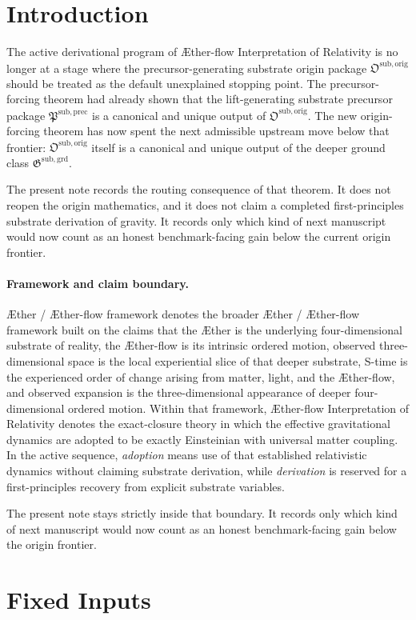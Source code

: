 \documentclass[11pt]{article}
\newcommand{\Aether}{\AE{}ther}
\newcommand{\Aflow}{\AE{}ther-flow}
\newcommand{\TheoryName}{\Aflow{} Interpretation of Relativity}
\newcommand{\TheoryProgram}{\Aether{} / \Aflow{} framework}
\newcommand{\PrecursorPackage}{\mathfrak P^{\mathrm{sub,prec}}}
\newcommand{\OriginPackage}{\mathfrak O^{\mathrm{sub,orig}}}
\newcommand{\GroundPackage}{\mathfrak G^{\mathrm{sub,grd}}}
\begin{document}
\section{Introduction}

The active derivational program of \TheoryName{} is no longer at a stage where the precursor-generating substrate origin package \(\OriginPackage\) should be treated as the default unexplained stopping point. The precursor-forcing theorem had already shown that the lift-generating substrate precursor package \(\PrecursorPackage\) is a canonical and unique output of \(\OriginPackage\). The new origin-forcing theorem has now spent the next admissible upstream move below that frontier: \(\OriginPackage\) itself is a canonical and unique output of the deeper ground class \(\GroundPackage\).

The present note records the routing consequence of that theorem. It does not reopen the origin mathematics, and it does not claim a completed first-principles substrate derivation of gravity. It records only which kind of next manuscript would now count as an honest benchmark-facing gain below the current origin frontier.

\paragraph{Framework and claim boundary.}
\TheoryProgram{} denotes the broader \Aether{} / \Aflow{} framework built on the claims that the \Aether{} is the underlying four-dimensional substrate of reality, the \Aflow{} is its intrinsic ordered motion, observed three-dimensional space is the local experiential slice of that deeper substrate, S-time is the experienced order of change arising from matter, light, and the \Aflow{}, and observed expansion is the three-dimensional appearance of deeper four-dimensional ordered motion. Within that framework, \TheoryName{} denotes the exact-closure theory in which the effective gravitational dynamics are adopted to be exactly Einsteinian with universal matter coupling. In the active sequence, \emph{adoption} means use of that established relativistic dynamics without claiming substrate derivation, while \emph{derivation} is reserved for a first-principles recovery from explicit substrate variables.

The present note stays strictly inside that boundary. It records only which kind of next manuscript would now count as an honest benchmark-facing gain below the origin frontier.

\section{Fixed Inputs}
\end{document}
